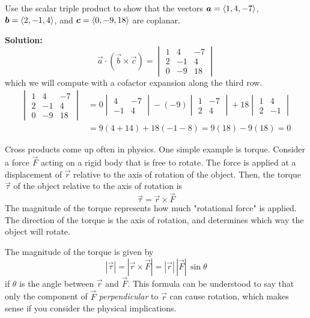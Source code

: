 \begin{example}
    Use the scalar triple product to show that the vectors \(\boldsymbol{a} = \left\langle1,4,-7\right\rangle\), \(\boldsymbol{b} =\left\langle2, -1, 4\right\rangle\), and \(\boldsymbol{c} = \left\langle0, -9, 18\right\rangle\) are coplanar. \par
    \textbf{Solution:} 
    \[ \vec a \cdot (\vec b \times \vec c) = \begin{vmatrix}
        1 & 4 & -7 \\
        2 & -1 & 4\\
        0 & -9 & 18
    \end{vmatrix} \]
    which we will compute with a cofactor expansion along the third row.
    \begin{align*}
        \begin{vmatrix}
        1 & 4 & -7 \\
        2 & -1 & 4\\
        0 & -9 & 18
    \end{vmatrix} &= 0\begin{vmatrix}
        4 & -7 \\
        -1 & 4
    \end{vmatrix} - (-9)\begin{vmatrix}
        1 & -7 \\
        2 & 4
    \end{vmatrix} + 18 \begin{vmatrix}
        1 & 4 \\
        2 & -1
    \end{vmatrix} \\
    &= 9(4+14) + 18(-1-8) = 9(18)-9(18)=0
    \end{align*}
\end{example}
Cross products come up often in physics. One simple example is torque. Consider a force \(\vec F\) acting on a rigid body that is free to rotate. The force is applied at a displacement of \(\vec r\) relative to the axis of rotation of the object. Then, the torque \(\vec \tau\) of the object relative to the axis of rotation is
\[\vec \tau = \vec r \times \vec F\]
The magnitude of the torque represents how much "rotational force" is applied. The direction of the torque is the axis of rotation, and determines which way the object will rotate. \par
The magnitude of the torque is given by
\[|\vec \tau| = |\vec r\times \vec F|=|\vec r|\,|\vec F|\,\sin\theta\]
if \(\theta\) is the angle between \(\vec r\) and \(\vec F\). This formula can be understood to say that only the component of \(\vec F\) \textit{perpendicular} to \(\vec r\) can cause rotation, which makes sense if you consider the physical implications.
